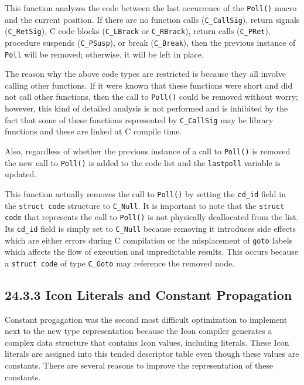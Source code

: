 
This function analyzes the code between the last occurrence of the
\texttt{Poll()} macro and the current position. If there are no
function calls (\texttt{C\_CallSig}), return signals
(\texttt{C\_RetSig}), C code blocks (\texttt{C\_LBrack} or
\texttt{C\_RBrack}), return calls (\texttt{C\_PRet}), procedure
suspends (\texttt{C\_PSusp}), or break (\texttt{C\_Break}), then the
previous instance of \texttt{Poll} will be removed; otherwise, it will
be left in place.

The reason why the above code types are restricted is because they all
involve calling other functions. If it were known that these functions
were short and did not call other functions, then the call to
\texttt{Poll()} could be removed without worry; however, this kind of
detailed analysis is not performed and is inhibited by the fact that
some of these functions represented by \texttt{C\_CallSig} may be
library functions and these are linked at C compile time.

Also, regardless of whether the previous instance of a call to
\texttt{Poll()} is removed the new call to \texttt{Poll()} is added to
the code list and the \texttt{lastpoll} variable is updated.



This function actually removes the call to \texttt{Poll()} by setting
the \texttt{cd\_id} field in the \texttt{struct code} structure to
\texttt{C\_Null}. It is important to note that the \texttt{struct
code} that represents the call to \texttt{Poll()} is not physically
deallocated from the list. Its \texttt{cd\_id} field is simply set
to \texttt{C\_Null} because removing it introduces side effects which
are either errors during C compilation or the misplacement of
\texttt{goto} labels which affects the flow of execution and
unpredictable results. This occurs because a \texttt{struct code}
of type \texttt{C\_Goto} may reference the removed node.

\subsection[24.3.3 Icon Literals and Constant Propagation]{24.3.3 Icon Literals and Constant Propagation}

Constant progagation was the second most difficult optimization to
implement next to the new type representation because the Icon
compiler generates a complex data structure that contains Icon values,
including literals. These Icon literals are assigned into this tended
descriptor table even though these values are constants. There are
several reasons to improve the representation of these constants.

